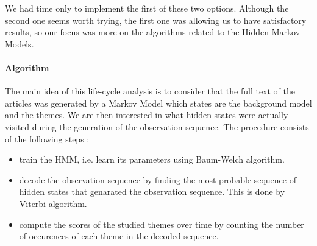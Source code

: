 We had time only to implement the first of these two options. Although the second one seems worth trying, the first one was allowing us to have satisfactory results, so our focus was more on the algorithms related to the Hidden Markov Models.


\paragraph{Algorithm}
The main idea of this life-cycle analysis is to consider that the full text of the articles was generated by a Markov Model which states are the background model and the themes. We are then interested in what hidden states were actually visited during the generation of the observation sequence. The procedure consists of the following steps :

\begin{itemize}
\item train the HMM, i.e. learn its parameters using Baum-Welch algorithm.
\item decode the observation sequence by finding the most probable sequence of hidden states that genarated the observation sequence. This is done by Viterbi algorithm.
\item compute the scores of the studied themes over time by counting the number of occurences of each theme in the decoded sequence.
\end{itemize}


